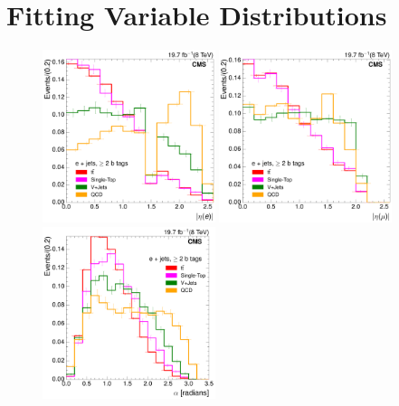 \section{Fitting Variable Distributions}
\label{as:fitting_variables_distributions}
\begin{figure}[H]
    \centering
     \includegraphics[width=0.45\textwidth]{Chapters/07_08_09_Analysis/Images/8TeV/fit_variables/electron/MET/electron_absolute_eta/MET_inclusive_electron_absolute_eta_2orMoreBtags_templates.pdf}\hfill
     \includegraphics[width=0.45\textwidth]{Chapters/07_08_09_Analysis/Images/8TeV/fit_variables/muon/MET/muon_absolute_eta/MET_inclusive_muon_absolute_eta_2orMoreBtags_templates.pdf}\\
     \includegraphics[width=0.45\textwidth]{Chapters/07_08_09_Analysis/Images/8TeV/fit_variables/electron/MET/angle_bl/MET_inclusive_angle_bl_2orMoreBtags_templates.pdf}\hfill

\end{figure}
